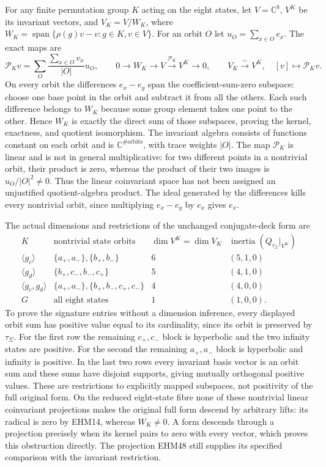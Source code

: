 \documentclass[
  10pt,
  a4paper,
]{article}
\newcounter{none} %
\begin{document}
For any finite permutation group \(K\) acting on the eight states, let
\(V=\mathbb C^8\), \(V^K\) be its invariant vectors, and \(V_K=V/W_K\),
where \(W_K=\operatorname{span}\{\rho(g)v-v:g\in K,v\in V\}\). For an
orbit \(O\) let \(u_O=\sum_{x\in O}e_x\). The exact maps are \[
\mathcal P_Kv=\sum_{O}\frac{\sum_{x\in O}v_x}{|O|}u_O,
\qquad
0\longrightarrow W_K\longrightarrow V\xrightarrow{\mathcal P_K}V^K\longrightarrow0,
\qquad V_K\xrightarrow{\sim}V^K,\quad[v]\mapsto\mathcal P_Kv.
\tag{EHM48}
\] On every orbit the differences \(e_x-e_y\) span the
coefficient-sum-zero subspace: choose one base point in the orbit and
subtract it from all the others. Each such difference belongs to \(W_K\)
because some group element takes one point to the other. Hence \(W_K\)
is exactly the direct sum of those subspaces, proving the kernel,
exactness, and quotient isomorphism. The invariant algebra consists of
functions constant on each orbit and is
\(\mathbb C^{\#\mathrm{orbits}}\), with trace weights \(|O|\). The map
\(\mathcal P_K\) is linear and is not in general multiplicative: for two
different points in a nontrivial orbit, their product is zero, whereas
the product of their two images is \(u_O/|O|^2\ne0\). Thus the linear
coinvariant space has not been assigned an unjustified quotient-algebra
product. The ideal generated by the differences kills every nontrivial
orbit, since multiplying \(e_x-e_y\) by \(e_x\) gives \(e_x\).

The actual dimensions and restrictions of the unchanged conjugate-deck
form are \[
\begin{array}{c|c|c|c}
K&\text{nontrivial state orbits}&\dim V^K=\dim V_K&
\operatorname{inertia}(Q_{\tau_\Sigma}|_{V^K})\\\hline
\langle g_c\rangle&\{a_+,a_-\},\{b_+,b_-\}&6&(5,1,0)\\
\langle g_d\rangle&\{b_+,c_-,b_-,c_+\}&5&(4,1,0)\\
\langle g_c,g_d\rangle&\{a_+,a_-\},\{b_+,b_-,c_+,c_-\}&4&(4,0,0)\\
G&\text{all eight states}&1&(1,0,0).
\end{array}
\tag{EHM49}
\] To prove the signature entries without a dimension inference, every
displayed orbit sum has positive value equal to its cardinality, since
its orbit is preserved by \(\tau_\Sigma\). For the first row the
remaining \(c_+,c_-\) block is hyperbolic and the two infinity states
are positive. For the second the remaining \(a_+,a_-\) block is
hyperbolic and infinity is positive. In the last two rows every
invariant basis vector is an orbit sum and these sums have disjoint
supports, giving mutually orthogonal positive values. These are
restrictions to explicitly mapped subspaces, not positivity of the full
original form. On the reduced eight-state fibre none of these nontrivial
linear coinvariant projections makes the original full form descend by
arbitrary lifts: its radical is zero by EHM14, whereas \(W_K\ne0\). A
form descends through a projection precisely when its kernel pairs to
zero with every vector, which proves this obstruction directly. The
projection EHM48 still supplies its specified comparison with the
invariant restriction.
\end{document}
